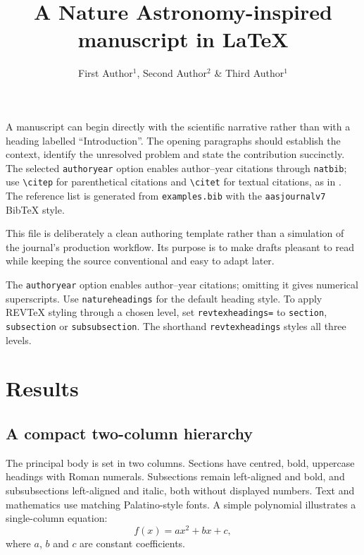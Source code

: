 \documentclass[10pt,a4paper,twocolumn]{article}
\title{A Nature Astronomy-inspired manuscript in \LaTeX}
\author{First Author$^{1}$, Second Author$^{2}$ \& Third Author$^{1}$}
\begin{document}
\maketitle

A manuscript can begin directly with the scientific narrative rather than with a heading labelled ``Introduction''. The opening paragraphs should establish the context, identify the unresolved problem and state the contribution succinctly. The selected \texttt{authoryear} option enables author--year citations through \texttt{natbib}; use \verb|\citep| for parenthetical citations \citep{DongMelatos2024,DongMelatos2025,DongEtAl2026} and \verb|\citet| for textual citations, as in \citet{DongMelatos2024}. The reference list is generated from \texttt{examples.bib} with the \texttt{aasjournalv7} BibTeX style.

This file is deliberately a clean authoring template rather than a simulation of the journal's production workflow. Its purpose is to make drafts pleasant to read while keeping the source conventional and easy to adapt later.

The \texttt{authoryear} option enables author--year citations; omitting it gives numerical superscripts. Use \texttt{natureheadings} for the default heading style. To apply REVTeX styling through a chosen level, set \texttt{revtexheadings=} to \texttt{section}, \texttt{subsection} or \texttt{subsubsection}. The shorthand \texttt{revtexheadings} styles all three levels.

\section{Results}
\subsection{A compact two-column hierarchy}
The principal body is set in two columns. Sections have centred, bold, uppercase headings with Roman numerals. Subsections remain left-aligned and bold, and subsubsections left-aligned and italic, both without displayed numbers. Text and mathematics use matching Palatino-style fonts. A simple polynomial illustrates a single-column equation:
\begin{equation}
  f(x) = ax^2 + bx + c,
\end{equation}
where $a$, $b$ and $c$ are constant coefficients.
\end{document}
